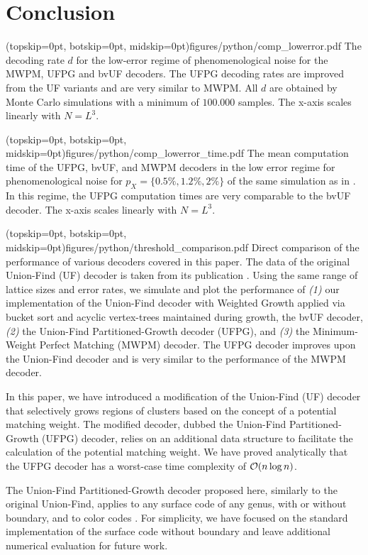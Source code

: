 \section{Conclusion}\label{sec:conclusion}

\Figure[b!](topskip=0pt, botskip=0pt, midskip=0pt){figures/python/comp_lowerror.pdf}{
  The decoding rate $d$ for the low-error regime of phenomenological noise for the MWPM, UFPG and bvUF decoders. The UFPG decoding rates are improved from the UF variants and are very similar to MWPM. All $d$ are obtained by Monte Carlo simulations with a minimum of $100.000$ samples. The x-axis scales linearly with $N = L^3$.\label{comp_lowerror}}

\Figure[b!](topskip=0pt, botskip=0pt, midskip=0pt){figures/python/comp_lowerror_time.pdf}{
  The mean computation time of the UFPG, bvUF, and MWPM decoders in the low error regime for phenomenological noise for $p_X = \{0.5\%, 1.2\%, 2\%\}$ of the same simulation as in . In this regime, the UFPG computation times are very comparable to the bvUF decoder. The x-axis scales linearly with $N = L^3$. \label{comp_lowerror_time}}

\Figure[t](topskip=0pt, botskip=0pt, midskip=0pt){figures/python/threshold_comparison.pdf}{
  Direct comparison of the performance of various decoders covered in this paper. The data of the original Union-Find (UF) decoder is taken from its publication \cite{delfosse2017almost}. Using the same range of lattice sizes and error rates, we simulate and plot the performance of \emph{(1)} our implementation of the Union-Find decoder with Weighted Growth applied via bucket sort and acyclic vertex-trees maintained during growth, the bvUF decoder, \emph{(2)} the Union-Find Partitioned-Growth decoder (UFPG), and  \emph{(3)} the Minimum-Weight Perfect Matching (MWPM) decoder. The UFPG decoder improves upon the Union-Find decoder and is very similar to the performance of the MWPM decoder. \label{thres_comp}}

In this paper, we have introduced a modification of the Union-Find (UF) decoder \cite{delfosse2017almost} that selectively grows regions of clusters based on the concept of a potential matching weight. The modified decoder, dubbed the Union-Find Partitioned-Growth (UFPG) decoder, relies on an additional data structure to facilitate the calculation of the potential matching weight. We have proved analytically that the UFPG decoder has a worst-case time complexity of $\mathcal{O}(n\log{n})$. 

The Union-Find Partitioned-Growth decoder proposed here, similarly to the original Union-Find, applies to any surface code of any genus, with or without boundary, and to color codes \cite{delfosse2017almost}. For simplicity, we have focused on the standard implementation of the surface code without boundary and leave additional numerical evaluation for future work.

